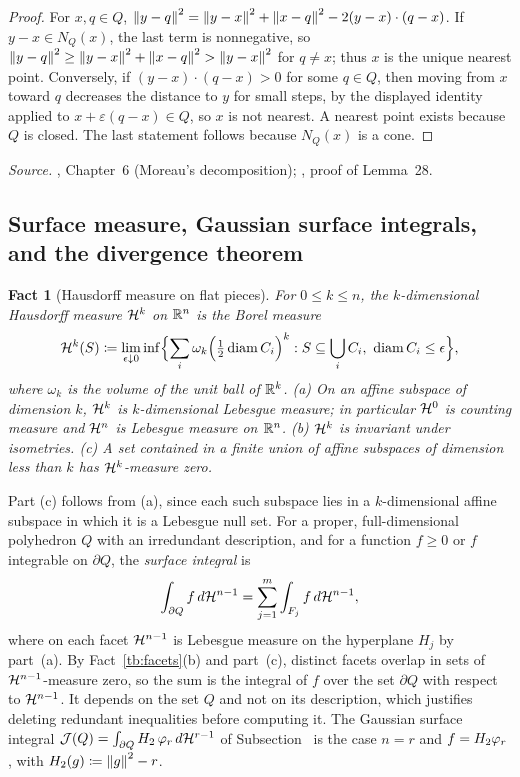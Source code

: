 \documentclass[11pt,letterpaper]{article}
\theoremstyle{plain}
\newtheorem{fact}{Fact}[section]
\begin{document}
\begin{proof}
For \(x,q\in Q\), \(\left\lVert y-q\right\rVert^2=\left\lVert y-x\right\rVert^2+\left\lVert x-q\right\rVert^2-2(y-x)\cdot(q-x)\).
If \(y-x\in N_Q(x)\), the last term is nonnegative, so
\(\left\lVert y-q\right\rVert^2\ge\left\lVert y-x\right\rVert^2+\left\lVert x-q\right\rVert^2>\left\lVert y-x\right\rVert^2\) for \(q\ne x\); thus
\(x\) is the unique nearest point. Conversely, if \((y-x)\cdot(q-x)>0\) for
some \(q\in Q\), then moving from \(x\) toward \(q\) decreases the distance
to \(y\) for small steps, by the displayed identity applied to
\(x+\varepsilon(q-x)\in Q\), so \(x\) is not nearest. A nearest point exists
because \(Q\) is closed. The last statement follows because \(N_Q(x)\) is a
cone.
\end{proof}

\emph{Source.} , Chapter~6 (Moreau's decomposition); ,
proof of Lemma~28.

\subsection{Surface measure, Gaussian surface integrals, and the
divergence theorem}\label{tb:sec:surface}

\begin{fact}[Hausdorff measure on flat pieces]\label{tb:hausdorff}
For \(0\le k\le n\), the \(k\)-dimensional Hausdorff measure \(\mathcal H^k\) on
\(\mathbb R^n\) is the Borel measure
\[
 \mathcal H^k(S)\coloneqq \lim_{\epsilon\downarrow0}\inf\Bigl\{\sum_i\omega_k
 \Bigl(\tfrac12\operatorname{diam}C_i\Bigr)^k:S\subseteq\bigcup_iC_i,\
 \operatorname{diam}C_i\le\epsilon\Bigr\},
\]
where \(\omega_k\) is the volume of the unit ball of \(\mathbb R^k\). (a) On an
affine subspace of dimension \(k\), \(\mathcal H^k\) is \(k\)-dimensional Lebesgue
measure; in particular \(\mathcal H^0\) is counting measure and \(\mathcal H^n\) is
Lebesgue measure on \(\mathbb R^n\). (b) \(\mathcal H^k\) is invariant under isometries.
(c) A set contained in a finite union of affine subspaces of dimension less
than \(k\) has \(\mathcal H^k\)-measure zero.
\end{fact}

Part (c) follows from (a), since each such subspace lies in a
\(k\)-dimensional affine subspace in which it is a Lebesgue null set. For a
proper, full-dimensional polyhedron \(Q\) with an irredundant description,
and for a function \(f\ge0\) or \(f\) integrable on \(\partial Q\), the
\emph{surface integral} is
\[
 \int_{\partial Q}f\,d\mathcal H^{n-1}=\sum_{j=1}^m\int_{F_j}f\,d\mathcal H^{n-1},
\]
where on each facet \(\mathcal H^{n-1}\) is Lebesgue measure on the hyperplane
\(H_j\) by part~(a). By Fact~\ref{tb:facets}(b) and part~(c), distinct
facets overlap in sets of \(\mathcal H^{n-1}\)-measure zero, so the sum is the
integral of \(f\) over the set \(\partial Q\) with respect to
\(\mathcal H^{n-1}\). It depends on the set \(Q\) and not on its description,
which justifies deleting redundant inequalities before computing it.
The Gaussian surface integral \(\mathcal J(Q)=\int_{\partial Q}H_2\,\varphi_r\,
d\mathcal H^{r-1}\) of Subsection~\PN{sec:outline-late}{2.4} is the case
\(n=r\) and \(f=H_2\varphi_r\), with \(H_2(g)\coloneqq \left\lVert g\right\rVert^2-r\).
\end{document}
